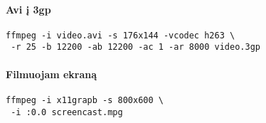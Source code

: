 \documentclass[11pt,a4paper]{article}
\begin{document}
\begin{multicols}{2}
  \paragraph{Avi į 3gp}
  \begin{verbatim}
ffmpeg -i video.avi -s 176x144 -vcodec h263 \
 -r 25 -b 12200 -ab 12200 -ac 1 -ar 8000 video.3gp
  \end{verbatim}

  \paragraph{Filmuojam ekraną}
  \begin{verbatim}
ffmpeg -i x11grapb -s 800x600 \
 -i :0.0 screencast.mpg
  \end{verbatim}


\end{multicols}
\end{document}

